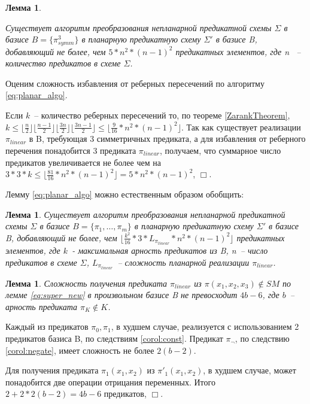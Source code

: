 \documentclass[12pt]{article}
\newtheorem{lemma}[theorem]{Лемма}
\newenvironment{proof}[1][Доказательство]{\begin{trivlist}
\item[\hskip \labelsep {\bfseries #1}]}{\end{trivlist}}
\begin{document}
\begin{lemma}
\label{eq:planar_algo_complexity}

Существует алгоритм преобразования непланарной предикатной схемы $\Sigma$ в базисе $B=\{\pi_{symm}^3\}$
в планарную предикатную схему $\Sigma'$ в базисе B, добавляющий не более, чем 
$5 * n^2*(n-1)^2 $ предикатных элементов, где n ~-- количество предикатов в схеме $\Sigma$.
\end{lemma}

\begin{proof}
Оценим сложность избавления от реберных пересечений по алгоритму \ref{eq:planar_algo}.

Если $k$~-- количество реберных пересечений то, по теореме \ref{ZarankTheorem}, 
$k \leq \lfloor \frac{n}{2} \rfloor \lfloor \frac{n-1}{2} \rfloor \lfloor \frac{3n}{2} \rfloor \lfloor \frac{3n-1}{2} \rfloor \le \lfloor \frac{9}{16} * n^2*(n-1)^2 \rfloor$.
Так как существует реализации $\pi_{linear}$ в B, требующая 3 симметричных предиката, а для избавления
от реберного перечения понадобится 3 предиката $\pi_{linear}$, получаем, 
что суммарное число предикатов увеличивается не более чем на
$3*3*k \leq \lfloor \frac{81}{16} * n^2 * (n-1)^2 \rfloor = 5 * n^2 * (n-1)^2$, $\Box$.
\end{proof}

Лемму \ref{eq:planar_algo} можно естественным образом обобщить:
\begin{lemma}
\label{general_planar_algo_complexity}
Существует алгоритм преобразования непланарной предикатной схемы $\Sigma$ в базисе $B = \{\pi_1, \dots, \pi_m \}$
в планарную предикатную схему $\Sigma'$ в базисе B, добавляющий не более, чем $\lfloor \frac{k^2}{16} * 3 * L_{\pi_{linear}} * n^2*(n-1)^2 \rfloor$ 
предикатных элементов, где $k$~- максимальная арность предикатов из B, n~-- число предикатов в схеме $\Sigma$, 
$L_{\pi_{linear}}$~-- сложность планарной реализации $\pi_{linear}$.
\end{lemma}

\begin{lemma}
\label{complexity}
Сложность получения предиката $\pi_{linear}$ из $\pi(x_1, x_2, x_3) \notin SM$ по лемме \ref{eq:super_new}
в произвольном базисе B не 
превосходит $4b - 6$, где $b$~-- арность предиката $\pi_K \notin K$.
\end{lemma}
\begin{proof}
Каждый из предикатов $\pi_0, \pi_1$, в худшем случае, реализуется с использованием 2 предикатов базиса B,
по следствиям \ref{corol:const}. Предикат $\pi_{\neg}$, по следствию \ref{corol:negate}, имеет сложность не более $2(b-2)$.

Для получения предиката  $\pi_1(x_1, x_2)$ из $\pi'_1(x_1, x_2)$, в худшем случае, может понадобится 
две операции отрицания переменных.
Итого $2 + 2 * 2(b-2) = 4b - 6$ предикатов, $\Box$.
\end{proof}
\end{document}
